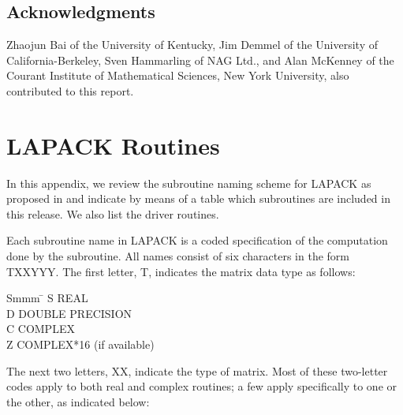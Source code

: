 \section*{Acknowledgments}

Zhaojun Bai of the University of Kentucky, Jim Demmel of the University
of California-Berkeley, Sven Hammarling
of NAG Ltd., and Alan McKenney of the Courant Institute of Mathematical
Sciences, New York University, also contributed to this report.

\clearpage
\def\thesection{\thechapter.\arabic{section}}

\appendix

\chapter{LAPACK Routines}

In this appendix, we review the subroutine naming scheme for LAPACK
as proposed in \cite{WN5}
and indicate by means of a table which subroutines
are included in this release. We also list the driver routines.

Each subroutine name in LAPACK is a coded specification of the
computation done by the subroutine.  All names consist of six
characters in the form TXXYYY.  The first letter, T, indicates the 
matrix data type as follows:
\begin{tabbing}
Smmm \= \kill
S \> REAL \\
D \> DOUBLE PRECISION \\
C \> COMPLEX \\
Z \> COMPLEX*16 (if available)
\end{tabbing}

The next two letters, XX, indicate the type of matrix. 
Most of these two-letter codes apply to both real and complex routines;
a few apply specifically to one or the other, as indicated below:

